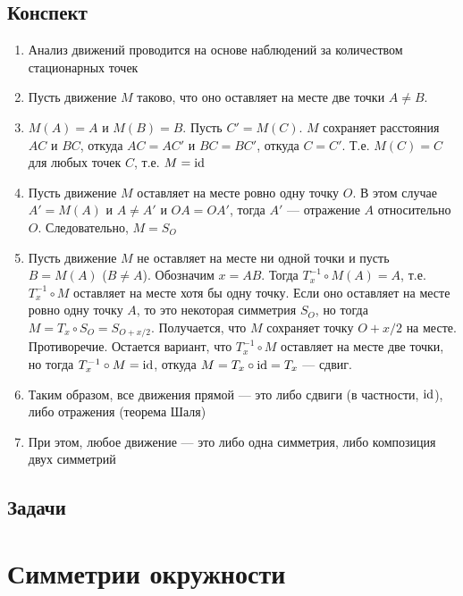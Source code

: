 \subsection{Конспект}
\begin{enumerate}\setlength{\itemsep}{1pt}
\item Анализ движений проводится на основе наблюдений за количеством стационарных точек
\item Пусть движение $M$ таково, что оно оставляет на месте две точки $A\ne B$.
\item $M(A)=A$ и $M(B)=B$. Пусть $C'=M(C)$. $M$ сохраняет расстояния $AC$ и $BC$, откуда $AC=AC'$ и $BC=BC'$, откуда $C=C'$. Т.е. $M(C)=C$ для любых точек $C$, т.е. $M=\mathrm{id}$
\item Пусть движение $M$ оставляет на месте ровно одну точку $O$. В этом случае $A'=M(A)$ и $A\ne A'$ и $OA=OA'$, тогда $A'$ --- отражение $A$ относительно $O$. Следовательно, $M=S_O$
\item Пусть движение $M$ не оставляет на месте ни одной точки и пусть $B=M(A)$ ($B\ne A$). Обозначим $x=AB$. Тогда $T_{x}^{-1}\circ M(A)=A$, т.е. $T_{x}^{-1}\circ M$ оставляет на месте хотя бы одну точку. Если оно оставляет на месте ровно одну точку $A$, то это некоторая симметрия $S_O$, но тогда $M=T_x\circ S_O=S_{O+x/2}$. Получается, что $M$ сохраняет точку $O+x/2$ на месте. Противоречие. Остается вариант, что $T_{x}^{-1}\circ M$ оставляет на месте две точки, но тогда $T_{x}^{-1}\circ M=\mathrm{id}$, откуда $M=T_x\circ \mathrm{id}=T_x$ --- сдвиг.
\item Таким образом, все движения прямой --- это либо сдвиги (в частности, $\mathrm{id}$), либо отражения (теорема Шаля)
\item При этом, любое движение --- это либо одна симметрия, либо композиция двух симметрий
\end{enumerate}
\subsection{Задачи}





\section{Симметрии окружности}

